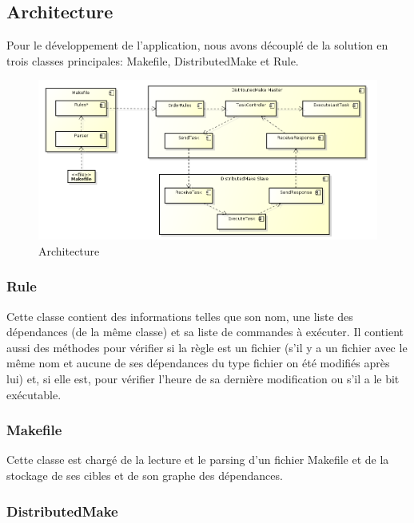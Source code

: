 \documentclass[a4paper,12pt,twoside]{article}
\begin{document}
\subsection{Architecture}

Pour le développement de l'application, nous avons découplé de la solution en
trois classes principales: Makefile, DistributedMake et Rule.

\begin{figure}[H]
  \centering
  \includegraphics[scale=0.4]{schema.png}
  \caption{Architecture}
  \label{fig:architecture}
\end{figure}

\subsubsection{Rule}

Cette classe contient des informations telles que son nom, une liste des dépendances (de la même classe) et sa liste de commandes à exécuter. Il contient aussi des méthodes pour vérifier si la règle est un fichier (s'il y a un fichier avec le même nom et aucune de ses dépendances du type fichier on été modifiés après lui) et, si elle est, pour vérifier l'heure de sa dernière modification ou s'il a le bit exécutable.

\subsubsection{Makefile}

Cette classe est chargé de la lecture et le parsing d'un fichier Makefile et de la stockage de ses cibles et de son graphe des dépendances.

\subsubsection{DistributedMake}
\end{document}
